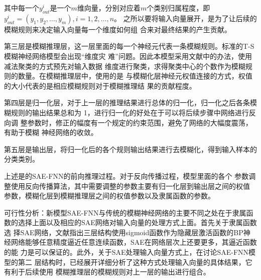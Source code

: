 \documentclass[12pt, a4paper]{article}
\begin{document}
其中每一个$y_{out}^{i}$是一个$m$维向量，分别对应着$m$个类别归属程度，即
$y_{out}^{i}=(y_1, y_2,\ldots, y_m), i=1,2,\ldots,n$。
之所以要将输入向量展开，是为了让后续的模糊规则来决定输入向量每一个维度如何组
合来对最终结果的产生贡献。
\par
第三层是模糊推理层，这一层里面的每一个神经元代表一条模糊规则。标准的T-S模糊神经网络模型会出现“维度灾
难”问题。因此本模型采用文献\cite{wp}中的办法，使用减法聚类\cite{zx}的方式预先对输入数据
维度进行聚类，求得聚类中心的个数作为模糊规则的数量。在模糊推理层中，使用的是
与模糊化层神经元权值连接的方式，权值的大小代表的是相应模糊规则对于模糊推理结
果的贡献程度。
\par
第四层是归一化层，对于上一层的推理结果进行总体的归一化，归一化之后各条模
糊规则的输出结果总和为 1，进行归一化的好处在于可以将后续步骤中网络进行反向调
整参数时，修正的幅度有一个规定的约束范围，避免了网络的大幅度震荡，有助于模糊
神经网络的收敛。
\par
第五层是输出层，将归一化后的各个规则输出结果进行去模糊化，得到输入样本的
分类类别。
\par
上述是的SAE-FNN的前向推理过程。对于反向传播过程，模型里面的各个
参数调整使用反向传播算法，其中需要调整的参数主要有归一化层到输出层之间的权值
参数，模糊化层到模糊推理层之间的权值参数以及隶属函数的参数。
\par
可行性分析：新模型SAE-FNN与传统的模糊神经网络的主要不同之处在于隶属函
数的选择上面以及相应的SAE网络对输入向量的处理方式上面。首先关于隶属函数选
择SAE网络，文献\cite{Hecht-Nielsen R}指出三层结构使用sigmoid函数作为隐藏层激活函数的BP神
经网络能够任意精度逼近任意连续函数，SAE在网络层次上还要更多，其逼近函数的能
力是可以保证的。此外，关于SAE处理输入向量方式上，在讨论SAE-FNN模型的第二
层结构时，已经展开详细分析了这种方式处理输入向量的具体结果，它有利于后续使用
模糊推理层的模糊规则对上一层的输出进行组合。
\end{document}
